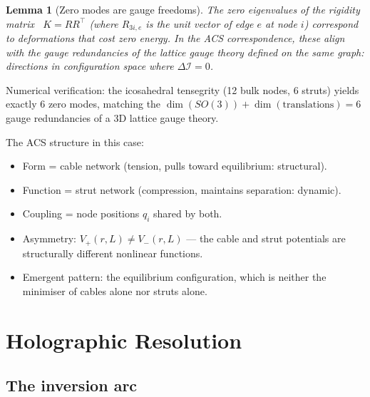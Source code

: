 \documentclass[12pt,a4paper]{article}
\theoremstyle{plain}
\newtheorem{lemma}[theorem]{Lemma}
\theoremstyle{definition}
\theoremstyle{remark}
\newcommand{\DI}{\Delta\mathcal{I}}
\begin{document}
\begin{lemma}[Zero modes are gauge freedoms]\label{lem:zero-modes}
The zero eigenvalues of the rigidity matrix~\cite{Connelly1996} $K = R R^\top$ 
(where $R_{3i, e}$ is the unit vector of edge $e$ at node $i$) correspond to 
deformations that cost zero energy.  In the ACS correspondence, these
align with the gauge redundancies of the lattice gauge theory defined on
the same graph: directions in configuration space where $\DI = 0$.
\end{lemma}

\noindent
Numerical verification: the icosahedral tensegrity (12 bulk nodes, 6 struts) 
yields exactly 6 zero modes, matching the $\dim(SO(3)) + \dim(\mathrm{translations}) = 6$ 
gauge redundancies of a 3D lattice gauge theory.

The ACS structure in this case:
\begin{itemize}[noitemsep]
  \item Form = cable network (tension, pulls toward equilibrium: structural).
  \item Function = strut network (compression, maintains separation: dynamic).
  \item Coupling = node positions $q_i$ shared by both.
  \item Asymmetry: $V_+(r,L) \neq V_-(r,L)$ --- the cable and strut potentials 
    are structurally different nonlinear functions.
  \item Emergent pattern: the equilibrium configuration, which is 
    neither the minimiser of cables alone nor struts alone.
\end{itemize}

\section{Holographic Resolution}
\label{sec:holographic}

\subsection{The inversion arc}
\end{document}
